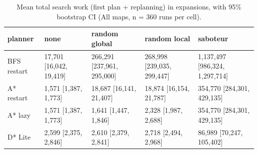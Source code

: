 \begin{table}[t]
\centering
\small
\caption{Mean total search work (first plan + replanning) in expansions, with 95\% bootstrap CI (All maps, n = 360 runs per cell).}
\label{tab:total-all}
\begin{tabular}{lllll}
\toprule
planner & none & random global & random local & saboteur \\
\midrule
BFS restart & 17,701 [16,042, 19,419] & 266,291 [237,961, 295,000] & 268,998 [239,035, 299,447] & 1,137,497 [986,324, 1,297,714] \\
A* restart & 1,571 [1,387, 1,773] & 18,687 [16,141, 21,407] & 18,874 [16,154, 21,787] & 354,770 [284,301, 429,135] \\
A* lazy & 1,571 [1,387, 1,773] & 1,641 [1,447, 1,846] & 2,328 [1,987, 2,688] & 354,770 [284,301, 429,135] \\
D* Lite & 2,599 [2,375, 2,846] & 2,610 [2,379, 2,841] & 2,718 [2,494, 2,968] & 86,989 [70,247, 105,402] \\
\bottomrule
\end{tabular}
\end{table}
